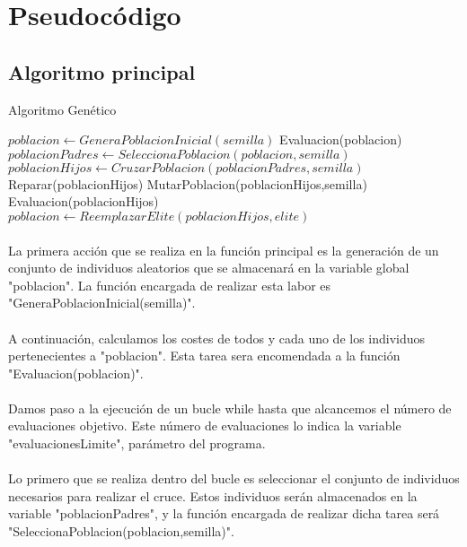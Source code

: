 	\section{Pseudocódigo}
	
	\subsection{Algoritmo principal}
	
		\begin{algorithm}[H]
			\caption{Algoritmo Genético}
			\begin{algorithmic}
				\STATE $poblacion \leftarrow GeneraPoblacionInicial(semilla)$
				\STATE Evaluacion(poblacion)
					\STATE $poblacionPadres \leftarrow SeleccionaPoblacion(poblacion,semilla)$
					\STATE $poblacionHijos \leftarrow CruzarPoblacion(poblacionPadres,semilla)$
					\STATE Reparar(poblacionHijos)
					\STATE MutarPoblacion(poblacionHijos,semilla)
					\STATE Evaluacion(poblacionHijos)
					\STATE $poblacion \leftarrow ReemplazarElite(poblacionHijos, elite)$
				\ENDWHILE	
			\end{algorithmic}
		\end{algorithm}
	
	\paragraph{}La primera acción que se realiza en la función principal es la generación de un conjunto de individuos aleatorios que se almacenará en la variable global "poblacion". La función encargada de realizar esta labor es "GeneraPoblacionInicial(semilla)".
	
	\paragraph{}A continuación, calculamos los costes de todos y cada uno de los individuos pertenecientes a "poblacion". Esta tarea sera encomendada a la función "Evaluacion(poblacion)".
	
	\paragraph{}Damos paso a la ejecución de un bucle while hasta que alcancemos el número de evaluaciones objetivo. Este número de evaluaciones lo indica la variable "evaluacionesLimite", parámetro del programa.
	
	\paragraph{}Lo primero que se realiza dentro del bucle es seleccionar el conjunto de individuos necesarios para realizar el cruce. Estos individuos serán almacenados en la variable "poblacionPadres", y la función encargada de realizar dicha tarea será "SeleccionaPoblacion(poblacion,semilla)".

